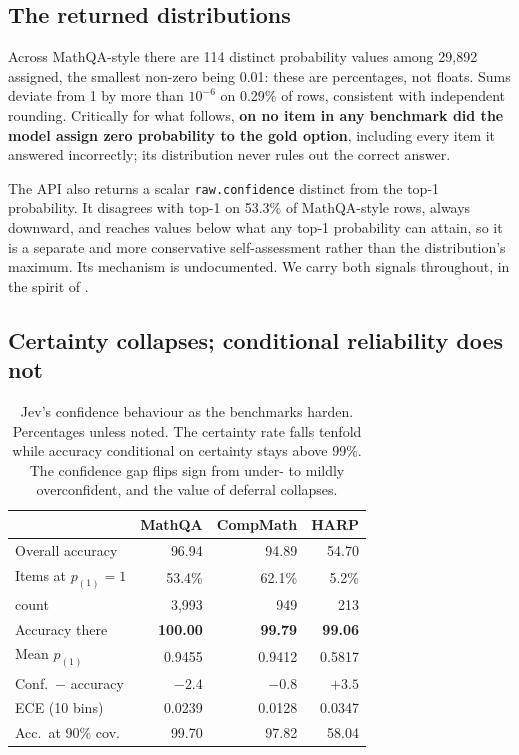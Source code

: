 \documentclass[11pt]{article}
\newcommand{\hi}[1]{\cellcolor{cellmagenta}\textbf{#1}}
\newcommand{\hic}[1]{\cellcolor{cellcyan}#1}
\newcommand{\hiy}[1]{\cellcolor{cellyellow}#1}
\begin{document}
\subsection{The returned distributions}
\label{sec:probs}

Across MathQA-style there are 114 distinct probability values among 29,892 assigned, the smallest non-zero being 0.01: these are percentages, not floats. Sums deviate from 1 by more than $10^{-6}$ on 0.29\% of rows, consistent with independent rounding. Critically for what follows, \textbf{on no item in any benchmark did the model assign zero probability to the gold option}, including every item it answered incorrectly; its distribution never rules out the correct answer.

The API also returns a scalar \texttt{raw.confidence} distinct from the top-1 probability. It disagrees with top-1 on 53.3\% of MathQA-style rows, always downward, and reaches values below what any top-1 probability can attain, so it is a separate and more conservative self-assessment rather than the distribution's maximum. Its mechanism is undocumented. We carry both signals throughout, in the spirit of \citet{lin2022teaching}.

\subsection{Certainty collapses; conditional reliability does not}
\label{sec:certainty}

\begin{table}[t]
\centering
\small
\setlength{\tabcolsep}{3.2pt}
\begin{tabular}{lrrr}
\toprule
 & \textbf{MathQA} & \textbf{CompMath} & \textbf{HARP} \\
\midrule
Overall accuracy & 96.94 & 94.89 & 54.70 \\
Items at $p_{(1)}{=}1$ & 53.4\% & 62.1\% & \hic{5.2\%} \\
\quad count & 3{,}993 & 949 & 213 \\
Accuracy there & \hi{100.00} & \hi{99.79} & \hi{99.06} \\
\midrule
Mean $p_{(1)}$ & 0.9455 & 0.9412 & 0.5817 \\
Conf.\ $-$ accuracy & $-2.4$ & $-0.8$ & $+3.5$ \\
ECE (10 bins) & 0.0239 & 0.0128 & 0.0347 \\
\midrule
Acc.\ at 90\% cov. & 99.70 & 97.82 & \hiy{58.04} \\
\bottomrule
\end{tabular}
\caption{Jev's confidence behaviour as the benchmarks harden. Percentages unless noted. The certainty rate falls tenfold while accuracy conditional on certainty stays above 99\%. The confidence gap flips sign from under- to mildly overconfident, and the value of deferral collapses.}
\label{tab:certainty}
\end{table}
\end{document}
